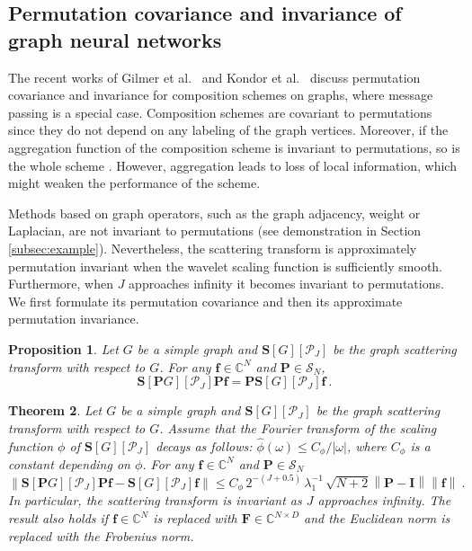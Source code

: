 \documentclass{article}
\newtheorem{theorem}{Theorem}[section]
\newtheorem{proposition}[theorem]{Proposition}
\def\l{\lambda}
\def\CC{\mathbb{C}}
\def\cP{\mathcal{P}}
\def\cS{\mathcal{S}}
\def\BF{\boldsymbol{F}}
\def\BI{\boldsymbol{I}}
\def\BP{\boldsymbol{P}}
\def\BS{\boldsymbol{S}}
\def\Bf{\boldsymbol{f}}
\newcommand{\norm}[1]{\left\lVert#1\right\rVert}
\begin{document}
\subsection{Permutation covariance and invariance of graph neural networks}
\label{subsec:main_results_cov_inv}
The recent works of Gilmer et al.~\cite{GilSR17} and Kondor et al.~\cite{KonS18} discuss permutation covariance and invariance for composition schemes on graphs, where message passing is a special case. Composition schemes are covariant to permutations since they do not depend on any labeling of the graph vertices. Moreover, if the aggregation function {of the composition scheme} is invariant to permutations, so is the whole scheme \cite[Proposition 2]{KonS18}. {However, aggregation leads to loss of local information, which might weaken the performance of the scheme.} 

Methods based on graph operators, such as the graph adjacency, weight or Laplacian, are not invariant 
to permutations (see demonstration in Section \ref{subsec:example}). Nevertheless, the scattering transform is approximately permutation invariant when the wavelet scaling function is sufficiently smooth. Furthermore, when $J$ approaches infinity it becomes invariant to permutations. We first formulate its permutation covariance and then its approximate permutation invariance.

\begin{proposition}\label{prop:permCov}
Let $G$ be a simple graph and $\BS[G][\cP_J]$ be the graph scattering transform with respect to $G$. For any $\Bf \in \CC^N$ and $\BP \in \cS_N$, 
\begin{equation}\label{eq:permCov}
\BS[\BP G][\cP_J] \BP \Bf = \BP \BS[G][\cP_J] \Bf ~.
\end{equation}
\end{proposition}







\begin{theorem}\label{thm:transinv}
Let $G$ be a simple graph and $\BS[G][\cP_J]$ be the graph scattering transform with respect to $G$. Assume that the Fourier transform of the scaling function $\phi$ of $\BS[G][\cP_J]$ decays as follows: $\hat{\phi}(\omega)  \leq C_{\phi} /|\omega|$, where $C_{\phi}$ is a constant depending on $\phi$. For any $\Bf \in \CC^N$ and $\BP \in \cS_N$
\begin{equation}
\label{eq:approx_inv}
\norm{\BS[\BP G][\cP_J] \BP \Bf - \BS[G][\cP_J] \Bf} \leq C_{\phi} \, 2^{-(J+0.5)}  \, \l_1^{-1} \, \sqrt{N+2} \norm{\BP-\BI} \norm{\Bf} ~.
\end{equation}
In particular, the scattering transform is invariant as $J$ approaches infinity.
The result also holds if $\Bf \in \CC^N$ is replaced with $\BF \in \CC^{N \times D}$ and the Euclidean norm is replaced with the Frobenius norm.
\end{theorem}
\end{document}
